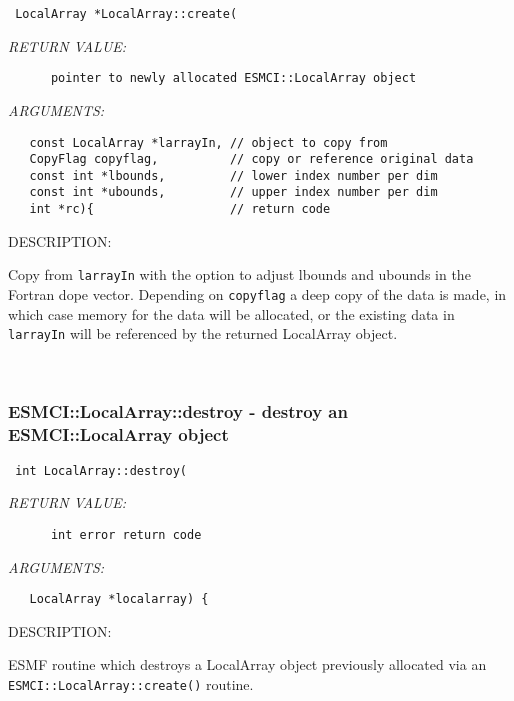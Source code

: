   
\begin{verbatim} LocalArray *LocalArray::create(\end{verbatim}{\em RETURN VALUE:}
\begin{verbatim}      pointer to newly allocated ESMCI::LocalArray object\end{verbatim}{\em ARGUMENTS:}
\begin{verbatim}   const LocalArray *larrayIn, // object to copy from
   CopyFlag copyflag,          // copy or reference original data
   const int *lbounds,         // lower index number per dim
   const int *ubounds,         // upper index number per dim
   int *rc){                   // return code\end{verbatim}
{\sf DESCRIPTION:\\ }


    Copy from {\tt larrayIn} with the option to adjust lbounds and ubounds in
    the Fortran dope vector. Depending on {\tt copyflag} a deep copy of the
    data is made, in which case memory for the data will be allocated, or
    the existing data in {\tt larrayIn} will be referenced by the returned
    LocalArray object.
   
 
\mbox{}\hrulefill\
 
\subsubsection [ESMCI::LocalArray::destroy] {ESMCI::LocalArray::destroy - destroy an ESMCI::LocalArray object}


  
\begin{verbatim} int LocalArray::destroy(\end{verbatim}{\em RETURN VALUE:}
\begin{verbatim}      int error return code\end{verbatim}{\em ARGUMENTS:}
\begin{verbatim}   LocalArray *localarray) {\end{verbatim}
{\sf DESCRIPTION:\\ }


    ESMF routine which destroys a LocalArray object previously allocated
    via an {\tt ESMCI::LocalArray::create()} routine.
   
 
